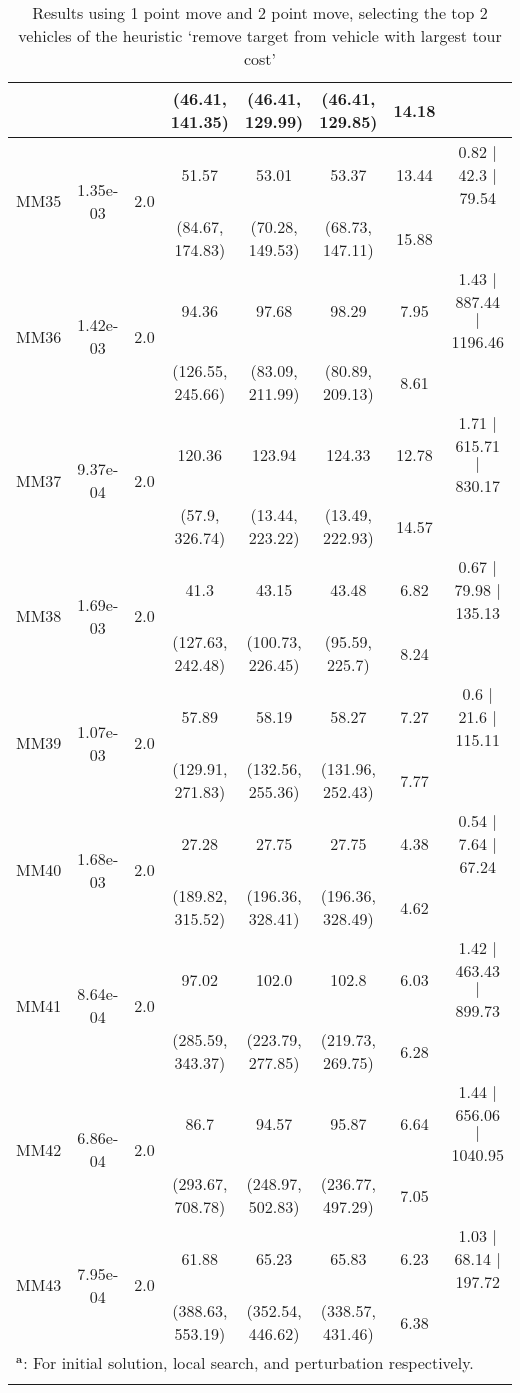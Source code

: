 \begin{longtable}{|c|c|c|c|c|c|c|c|}
	 &  &  & (46.41, 141.35) & (46.41, 129.99) & (46.41, 129.85) & 14.18 & \\
 	\hline
	\multirow{2}{*}{MM35} & \multirow{2}{*}{1.35e-03} & \multirow{2}{*}{2.0} & 51.57 & 53.01 & 53.37 & 13.44 & 0.82 $\mid$ 42.3 $\mid$ 79.54\\
	 &  &  & (84.67, 174.83) & (70.28, 149.53) & (68.73, 147.11) & 15.88 & \\
 	\hline
	\multirow{2}{*}{MM36} & \multirow{2}{*}{1.42e-03} & \multirow{2}{*}{2.0} & 94.36 & 97.68 & 98.29 & 7.95 & 1.43 $\mid$ 887.44 $\mid$ 1196.46\\
	 &  &  & (126.55, 245.66) & (83.09, 211.99) & (80.89, 209.13) & 8.61 & \\
 	\hline
	\multirow{2}{*}{MM37} & \multirow{2}{*}{9.37e-04} & \multirow{2}{*}{2.0} & 120.36 & 123.94 & 124.33 & 12.78 & 1.71 $\mid$ 615.71 $\mid$ 830.17\\
	 &  &  & (57.9, 326.74) & (13.44, 223.22) & (13.49, 222.93) & 14.57 & \\
 	\hline
	\multirow{2}{*}{MM38} & \multirow{2}{*}{1.69e-03} & \multirow{2}{*}{2.0} & 41.3 & 43.15 & 43.48 & 6.82 & 0.67 $\mid$ 79.98 $\mid$ 135.13\\
	 &  &  & (127.63, 242.48) & (100.73, 226.45) & (95.59, 225.7) & 8.24 & \\
 	\hline
	\multirow{2}{*}{MM39} & \multirow{2}{*}{1.07e-03} & \multirow{2}{*}{2.0} & 57.89 & 58.19 & 58.27 & 7.27 & 0.6 $\mid$ 21.6 $\mid$ 115.11\\
	 &  &  & (129.91, 271.83) & (132.56, 255.36) & (131.96, 252.43) & 7.77 & \\
 	\hline
	\multirow{2}{*}{MM40} & \multirow{2}{*}{1.68e-03} & \multirow{2}{*}{2.0} & 27.28 & 27.75 & 27.75 & 4.38 & 0.54 $\mid$ 7.64 $\mid$ 67.24\\
	 &  &  & (189.82, 315.52) & (196.36, 328.41) & (196.36, 328.49) & 4.62 & \\
 	\hline
	\multirow{2}{*}{MM41} & \multirow{2}{*}{8.64e-04} & \multirow{2}{*}{2.0} & 97.02 & 102.0 & 102.8 & 6.03 & 1.42 $\mid$ 463.43 $\mid$ 899.73\\
	 &  &  & (285.59, 343.37) & (223.79, 277.85) & (219.73, 269.75) & 6.28 & \\
 	\hline
	\multirow{2}{*}{MM42} & \multirow{2}{*}{6.86e-04} & \multirow{2}{*}{2.0} & 86.7 & 94.57 & 95.87 & 6.64 & 1.44 $\mid$ 656.06 $\mid$ 1040.95\\
	 &  &  & (293.67, 708.78) & (248.97, 502.83) & (236.77, 497.29) & 7.05 & \\
 	\hline
	\multirow{2}{*}{MM43} & \multirow{2}{*}{7.95e-04} & \multirow{2}{*}{2.0} & 61.88 & 65.23 & 65.83 & 6.23 & 1.03 $\mid$ 68.14 $\mid$ 197.72\\
	 &  &  & (388.63, 553.19) & (352.54, 446.62) & (338.57, 431.46) & 6.38 & \\
 	\hline
	\multicolumn{8}{l}{$^{\mathrm{\boldsymbol{a}}}$: For initial solution, local search, and perturbation respectively.}\\

\caption{Results using 1 point move and 2 point move, selecting the top 2 vehicles of the heuristic \lq remove target from vehicle with largest tour cost\rq }
\end{longtable}
